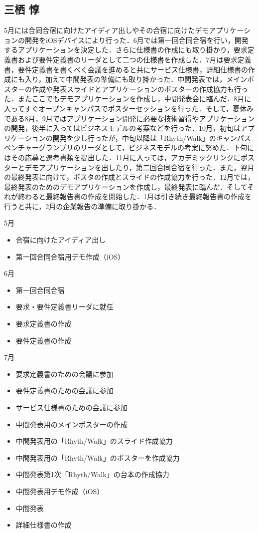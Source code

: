 \subsection{三栖 惇}
\par
5月には合同合宿に向けたアイディア出しやその合宿に向けたデモアプリケーションの開発をiOSデバイスにより行った．6月では第一回合同合宿を行い，開発するアプリケーションを決定した．さらに仕様書の作成にも取り掛かり，要求定義書および要件定義書のリーダとして二つの仕様書を作成した．7月は要求定義書，要件定義書を書くべく会議を進めると共にサービス仕様書，詳細仕様書の作成にも入り，加えて中間発表の準備にも取り掛かった．中間発表では，メインポスターの作成や発表スライドとアプリケーションのポスターの作成協力も行った．またここでもデモアプリケーションを作成し，中間発表会に臨んだ．8月に入ってすぐオープンキャンパスでポスターセッションを行った．そして，夏休みである8月，9月ではアプリケーション開発に必要な技術習得やアプリケーションの開発，後半に入ってはビジネスモデルの考案などを行った．10月，初旬はアプリケーションの開発を少し行ったが，中旬以降は「Rhyth/Walk」のキャンパスベンチャーグランプリのリーダとして，ビジネスモデルの考案に努めた．下旬にはその応募と選考書類を提出した．11月に入っては，アカデミックリンクにポスターとデモアプリケーションを出したり，第二回合同合宿を行った．また，翌月の最終発表に向けて，ポスタの作成とスライドの作成協力を行った．12月では，最終発表のためのデモアプリケーションを作成し，最終発表に臨んだ．そしてそれが終わると最終報告書の作成を開始した．1月は引き続き最終報告書の作成を行うと共に，2月の企業報告の準備に取り掛かる．
\par
5月
\begin{itemize}
\item 合宿に向けたアイディア出し
\item 第一回合同合宿用デモ作成（iOS）
\end{itemize}
6月
\begin{itemize}
\item 第一回合同合宿
\item 要求・要件定義書リーダに就任
\item 要求定義書の作成
\item 要件定義書の作成
\end{itemize}
7月
\begin{itemize}
\item 要求定義書のための会議に参加
\item 要件定義書のための会議に参加
\item サービス仕様書のための会議に参加
\item 中間発表用のメインポスターの作成
\item 中間発表用の「Rhyth/Walk」のスライド作成協力
\item 中間発表用の「Rhyth/Walk」のポスターを作成協力
\item 中間発表第1次「Rhyth/Walk」の台本の作成協力
\item 中間発表用デモ作成（iOS）
\item 中間発表
\item 詳細仕様書の作成
\end{itemize}
